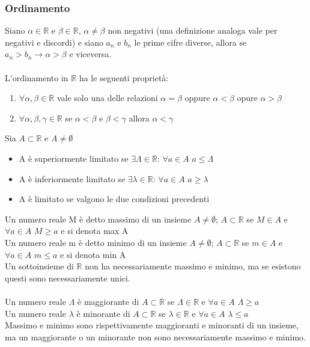 \documentclass{article}
\begin{document}
\subsubsection{Ordinamento}
Siano $\alpha \in \mathds{R}$ e $\beta \in \mathds{R}$, $\alpha \neq \beta$ non negativi (una definizione analoga vale per negativi e discordi) e siano $a_n$ e $b_n$ le prime cifre diverse, allora se $a_n > b_n \rightarrow \alpha > \beta$ e viceversa.\\\\
L'ordinamento in $\mathds{R}$ ha le seguenti proprietà:
\begin{enumerate}
    \item
    $\forall \alpha, \beta \in \mathds{R}$ vale solo una delle relazioni $\alpha = \beta$ oppure $\alpha < \beta$ opure $\alpha > \beta$
    \item
    $\forall \alpha, \beta, \gamma \in \mathds{R}$ se $\alpha < \beta$ e $\beta < \gamma$ allora $\alpha < \gamma$
\end{enumerate}
Sia $A \subset \mathds{R}$ e $A \neq \emptyset$
\begin{itemize}
    \item 
    A è superiormente limitato se $\exists \Lambda \in \mathds{R}$: $\forall a \in A$ $a \leq \Lambda$
    \item
    A è inferiormente limitato se $\exists \lambda \in \mathds{R}$: $\forall a \in A$ $a \geq \lambda$
    \item
    A è limitato se valgono le due condizioni precedenti
\end{itemize}
Un numero reale M è detto massimo di un insieme $A \neq \emptyset$; $A \subset \mathds{R}$ se $M \in A$ e $\forall a \in A$ $M \geq a$ e si denota max A\\
Un numero reale m è detto minimo di un insieme $A \neq \emptyset$; $A \subset \mathds{R}$ se $m \in A$ e $\forall a \in A$ $m \leq a$ e si denota min A\\
Un sottoinsieme di $\mathds{R}$ non ha necessariamente massimo e minimo, ma se esistono questi sono necessariamente unici.\\\\
Un numero reale $\Lambda$ è maggiorante di $A \subset \mathds{R}$ se $\Lambda \in \mathds{R}$ e $\forall a \in A$ $\Lambda \geq a$\\
Un numero reale $\lambda$ è minorante di $A \subset \mathds{R}$ se $\lambda \in \mathds{R}$ e $\forall a \in A$ $\lambda \leq a$\\
Massimo e minimo sono rispettivamente maggioranti e minoranti di un insieme, ma un maggiorante o un minorante non sono necessariamente massimo e minimo.\\
\end{document}
